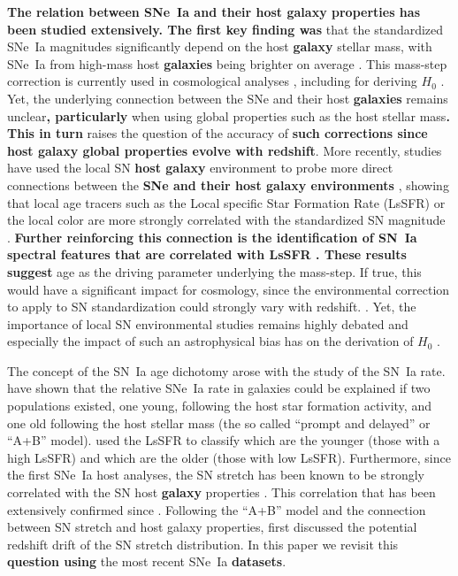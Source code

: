 \documentclass[]{aa}
\begin{document}
\textbf{The relation between SNe~Ia and their host galaxy properties has been
studied extensively. The first key finding was} that the standardized SNe~Ia
magnitudes significantly depend on the host \textbf{galaxy} stellar mass, with
SNe~Ia from high-mass host \textbf{galaxies} being brighter on average
\cite[e.g.][]{kelly2010, sullivan2010, childress2013, betoule2014, rigault2020,
kim19}. This mass-step correction is currently used in cosmological analyses
\citep[e.g.][]{betoule2014, scolnic2018a}, including for deriving $H_0$
\citep{riess2016, riess2019}. Yet, the underlying connection between the SNe and
their host \textbf{galaxies} remains unclear\textbf{, particularly} when using
global properties such as the host stellar mass\textbf{. This in turn} raises
the question of the accuracy of \textbf{such corrections since host galaxy
global properties evolve with redshift}. More recently, studies have used the
local SN \textbf{host galaxy} environment to probe more direct connections
between the \textbf{SNe and their host galaxy environments} \citep{rigault2013},
showing that local age tracers such as the Local specific Star Formation Rate
(LsSFR) or the local color are more strongly correlated with the standardized SN
magnitude \citep{roman2018, kim18,rigault2020}. \textbf{Further reinforcing this
connection is the identification of SN~Ia spectral features that are correlated
with LsSFR \citep{nordin2018}. These results suggest} age as the driving
parameter underlying the mass-step. If true, this would have a significant
impact for cosmology, since the environmental correction to apply to SN
standardization could strongly vary with redshift. \citep{rigault2013,
childress2014, scolnic2018a}. Yet, the importance of local SN environmental
studies remains highly debated \cite[e.g.][]{jones2015, jones2019} and
especially the impact of such an astrophysical bias has on the derivation of
$H_0$ \citep{jones2015, riess2016, riess2018, rose2019}. 

The concept of the SN~Ia age dichotomy arose with the study of the SN~Ia rate.
\cite{mannucci2005, scannapieco2005, sullivan2006, aubourg2008} have shown that
the relative SNe~Ia rate in galaxies could be explained if two populations
existed, one young, following the host star formation activity, and one old
following the host stellar mass (the so called ``prompt and delayed'' or ``A+B''
model). \cite{rigault2020} used the LsSFR to classify which are the younger
(those with a high LsSFR) and which are the older (those with low LsSFR).
Furthermore, since the first SNe~Ia host analyses, the SN stretch has been known
to be strongly correlated with the SN host \textbf{galaxy} properties
\citep{hamuy1996, hamuy2000}. This correlation that has been extensively
confirmed since \citep[e.g.][]{neill2009, sullivan2010, lampeitl2010, kelly2010,
gupta2011, dandrea2011, childress2013, rigault2013, pan2014, kim19}. Following
the ``A+B'' model and the connection between SN stretch and host galaxy
properties, \cite{howell2007} first discussed the potential redshift drift of
the SN stretch distribution. In this paper we revisit this \textbf{question
using} the most recent SNe~Ia \textbf{datasets}.
\end{document}
